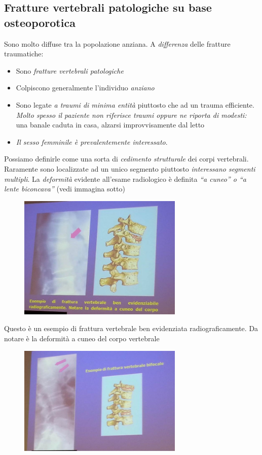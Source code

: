 \subsection{Fratture vertebrali patologiche su base osteoporotica}

Sono molto diffuse tra la popolazione anziana. A \emph{differenza} delle fratture traumatiche:

\begin{itemize}
\item
  Sono \emph{fratture vertebrali patologiche}
\item
  Colpiscono generalmente l'individuo \emph{anziano}
\item
  Sono legate \emph{a traumi di minima entità} piuttosto che ad un trauma efficiente. \emph{Molto spesso il paziente non riferisce traumi oppure ne riporta di modesti:} una banale caduta in casa, alzarsi improvvisamente dal letto
\item
  \emph{Il sesso femminile è prevalentemente interessato}.
\end{itemize}

Possiamo definirle come una sorta di \emph{cedimento strutturale} dei corpi vertebrali. Raramente sono localizzate ad un unico segmento piuttosto \emph{interessano segmenti multipli}. La \emph{deformità} evidente all'esame radiologico è definita \emph{``a cuneo'' o ``a lente biconcava''} (vedi immagina sotto)

\begin{figure}[!ht]
\centering
\includegraphics[width=0.7\textwidth]{003/image3.jpeg}
\end{figure}

Questo è un esempio di frattura vertebrale ben evidenziata radiograficamente. Da notare è la deformità a cuneo del corpo vertebrale

\begin{figure}[!ht]
\centering
\includegraphics[width=0.7\textwidth]{003/image4.jpeg}
\end{figure}

